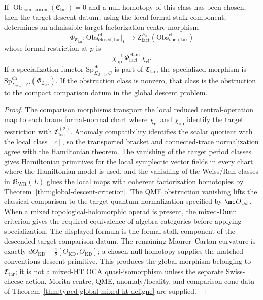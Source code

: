 \begin{thm}
  If \(\operatorname{Ob}_{\mathrm{comparison}}(\mathfrak C_{\mathrm{tar}})=0\)
  and a null-homotopy of this class has been chosen, then the target
  descent datum, using the local formal-stalk component, determines an
  admissible target factorization-centre morphism
  \[
    \Phi_{\mathfrak C_{\mathrm{tar}}}\colon
    \mathrm{Obs}^{\mathrm{cl}}_{\mathrm{closed},\mathrm{tar}}\big|_L
      \longrightarrow
    \mathrm Z^{P_0}_{\mathrm{fact}}
      (\mathrm{Obs}^{\mathrm{cl}}_{\mathrm{open},\mathrm{tar}})
  \]
  whose formal restriction at \(p\) is
  \[
    \chi_{\mathrm{op}}^{-1}\,
    \Phi^{\mathrm{Ham}}_{\mathrm{fact}}\,
    \chi_{\mathrm{cl}}.
  \]
  If a specialization functor
  \(\mathrm{Sp}^{\mathrm{ch}}_{\Sigma_{d-1},C}\) is part of
  \(\mathfrak C_{\mathrm{tar}}\), the specialized morphism is
  \(\mathrm{Sp}^{\mathrm{ch}}_{\Sigma_{d-1},C}(\Phi_{\mathfrak C_{\mathrm{tar}}})\).
  If the obstruction class is nonzero, that class is the obstruction to
  the compact comparison datum in the global descent problem.
\end{thm}

\begin{proof}
  The comparison morphisms transport the local reduced central-operation map to
  each brane formal-normal chart where \(\chi_{\mathrm{cl}}\) and
  \(\chi_{\mathrm{op}}\) identify the target restriction with
  \(\mathfrak C_{\mathrm{loc}}^{(2)}\).  Anomaly compatibility identifies the scalar
  quotient with the local class \([\bar c]\), so the transported bracket and
  connected-trace normalization agree with the Hamiltonian theorem.  The
  vanishing of the target period classes gives Hamiltonian primitives for
  the local symplectic vector fields in every chart where the Hamiltonian
  model is used, and the vanishing of the Weiss/Ran classes in
  \(\mathfrak G_{\mathrm{WR}}(L)\) glues the local maps with coherent
  factorization homotopies by
  Theorem~\ref{thm:global-descent-criterion}.  The QME obstruction
  vanishing lifts the classical comparison to the target quantum
  normalization specified by \(\mc O_{\mathrm{tar}}\).  When a mixed
  topological-holomorphic operad is present, the mixed-Dunn criterion gives
  the required equivalence of algebra categories before applying
  specialization.  The displayed formula is the formal-stalk component of
  the descended target comparison datum.  The remaining Maurer--Cartan
  curvature is exactly
  \(d\Theta_{\mathrm{KD}}+\frac12[\Theta_{\mathrm{KD}},\Theta_{\mathrm{KD}}]\);
  a chosen null-homotopy supplies the matched-conventions descent
  primitive.  This produces the global morphism belonging to
  \(\mathfrak C_{\mathrm{tar}}\); it is not a mixed-HT OCA
  quasi-isomorphism unless the separate Swiss-cheese action, Morita
  centre, QME, anomaly/locality, and comparison-cone data of
  Theorem~\ref{thm:typed-global-mixed-ht-deligne} are supplied.
\end{proof}

